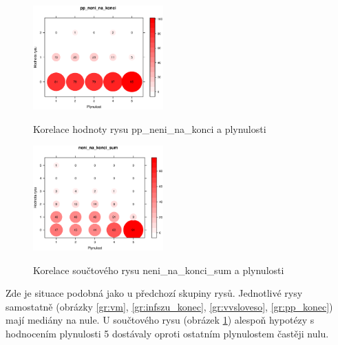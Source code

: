 \documentclass[12pt,a4paper]{report}
\begin{document}
\begin{figure}[!htb]
\begin{center}
  \centering\includegraphics[width=50mm]{./grafy/rysy/pp_neni_na_konci-c.eps}
  \caption{Korelace hodnoty rysu pp\_neni\_na\_konci a plynulosti}\label{gr:pp_konec}
\endminipage\quad
{} 
  \centering\includegraphics[width=50mm]{./grafy/rysy/neni_na_konci_sum-c.eps}
  \caption{Korelace součtového rysu neni\_na\_konci\_sum a plynulosti}\label{gr:sumneni}
\endminipage
\end{center}
\end{figure}


Zde je situace podobná jako u předchozí skupiny rysů. Jednotlivé rysy samostatně (obrázky \ref{gr:vm}, \ref{gr:infszu_konec}, \ref{gr:vvsloveso}, \ref{gr:pp_konec}) mají mediány na nule. U součtového rysu (obrázek \ref{gr:sumneni}) alespoň hypotézy s hodnocením plynulosti 5 dostávaly oproti ostatním plynulostem častěji nulu.
\end{document}
